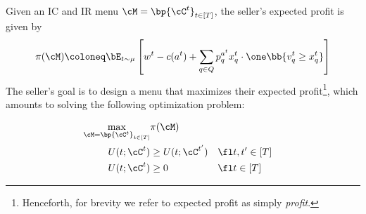 
Given an IC and IR menu $\cM = \bp{\cC^t}_{t \in [T]}$, the seller's expected profit is given by 
\begin{align*}
    \pi(\cM) \coloneq \bE_{t \sim \mu} \left[ w^t  - c(a^t) + \sum_{q\in Q} p^{a^t}_q x^t_q \cdot \one\bb{v^t_q \ge x^t_q} \right]
\end{align*}
The seller's goal is to design a menu that maximizes their expected profit\footnote{Henceforth, for brevity we refer to expected profit as simply \emph{profit}.}, which amounts to solving the following optimization problem:

\begin{tcolorbox}[title=Maximizing profit of a direct menu]
\begin{align}
 \max_{\cM = \bp{\cC^t}_{t \in [T]}}  & \pi(\cM) \label{profit-maximization-direct-menu} \\
         U(t; \cC^t) &\geq U(t; \cC^{t'}) & & \fl t, t' \in [T]  \notag \\ 
         U(t; \cC^t) &\geq 0  && \fl t \in [T] \notag
\end{align}
\end{tcolorbox}



